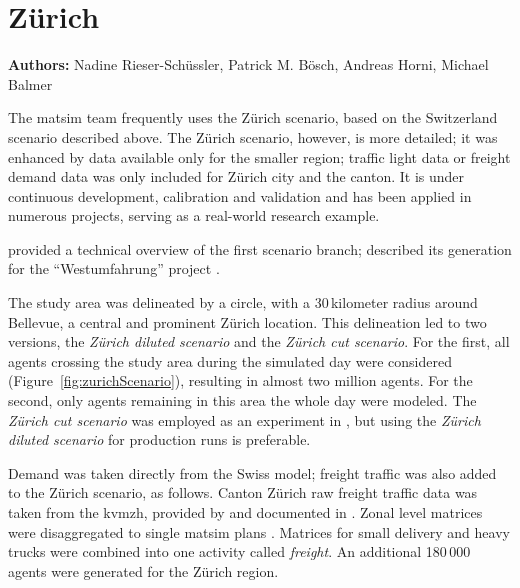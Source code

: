 \chapter{Zürich}
\label{ch:zhscenario}
\hfill \textbf{Authors:} Nadine Rieser-Schüssler, Patrick M. Bösch, Andreas Horni, Michael Balmer


The \gls{matsim} team frequently uses the Zürich scenario, based on the Switzerland scenario described above. The Zürich scenario, however, is more detailed; it was enhanced by data available only for the smaller region; \eg traffic light data or freight demand data was only included for Zürich city and the canton. It is under continuous development, calibration and validation and has been applied in numerous projects, serving as a real-world research example.   

\citet{HorniEtAl_TechRep_IVT_2011_a} provided a technical overview of the first scenario branch; \citet[][]{BalmerEtAl_ResRep_bdktzrh_2009} described its generation for the ``Westumfahrung'' project . 

The study area was delineated by a circle, with a 30\,kilometer radius around Bellevue, a central and prominent Zürich location. This delineation led to two versions,  the \emph{Zürich diluted scenario} and the \emph{Zürich cut scenario}. For the first, all agents crossing the study area during the simulated day were considered (Figure~\ref{fig:zurichScenario}), resulting in almost two million agents. For the second, only agents remaining in this area the whole day were modeled. The \emph{Zürich cut scenario} was employed as an experiment in \citet[][]{Hackney_PhDThesis_2009}, but using the \emph{Zürich diluted scenario} for production runs is preferable.

Demand was taken directly from the Swiss model; freight traffic was also added to the Zürich scenario, as follows. Canton Zürich raw freight traffic data was taken from the \gls{kvmzh}, provided by \citet{AMV_Webpage_2011} and documented in \citet[][]{GottardiBuergler_SV_1999}. Zonal level matrices were disaggregated to single \gls{matsim} plans \citep[][]{ShahM_TechRep_IVT_2010}. Matrices for small delivery and heavy trucks were combined into one activity called \emph{freight}. An additional 180\,000 agents were generated for the Zürich region.

